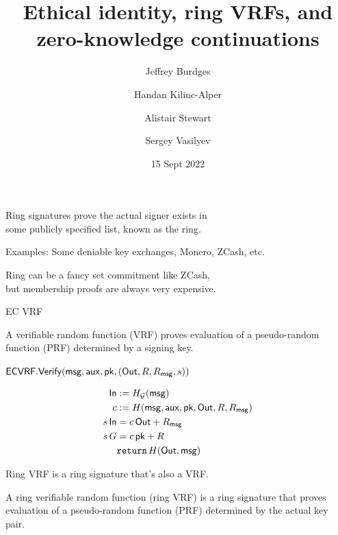 \documentclass{beamer}
\title{Ethical identity, ring VRFs, and \\ zero-knowledge continuations}
\author{Jeffrey Burdges \and Handan Kilinc-Alper \and Alistair Stewart \and Sergey Vasilyev}
\date{15 Sept 2022}
\begin{document}
\maketitle



\begin{frame}
	
Ring signatures prove the actual signer exists in \\
\hspace{10pt} some publicly specified list, known as the ring.

\bigskip\bigskip

Examples:  Some deniable key exchanges, Monero, ZCash, etc.

\bigskip\bigskip

Ring can be a fancy set commitment like ZCash, \\
\hspace{10pt} but membership proofs are always very expensive.
	
\end{frame}



\begin{frame}{EC VRF}

A verifiable random function (VRF) proves evaluation of a pseudo-random function (PRF) determined by a signing key.

\bigskip\bigskip

$\mathsf{ECVRF}.{\mathsf{Verify}}(\mathsf{msg},\mathsf{aux},\mathsf{pk},({\mathsf{Out}},R,R_\mathsf{msg},s))$
	
$$ \begin{aligned}
{\ensuremath{\mathsf{In}}} &:= H_{\mathcal{G}}(\mathsf{msg}) \\
c &:= H(\mathsf{msg},\mathsf{aux},\mathsf{pk},{\mathsf{Out}},R,R_\mathsf{msg}) \\
s \, {\mathsf{In}} &= c \, {\mathsf{Out}} + R_\mathsf{msg} \\
s \, G &= c \, \mathsf{pk} + R \\
& \mathtt{return}\, H({\mathsf{Out}},\mathsf{msg}) \\
\end{aligned} $$
	
\end{frame}



\begin{frame}

Ring VRF is a ring signature that's also a VRF.

\bigskip\bigskip 

A ring verifiable random function (ring VRF) is a ring signature that proves evaluation of a pseudo-random function (PRF) determined by the actual key pair.

\end{frame}
\end{document}
